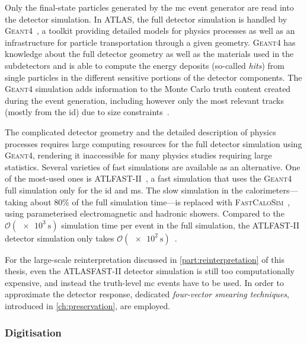 Only the final-state particles generated by the \gls{mc} event generator are read into the detector simulation. In ATLAS, the full detector simulation is handled by \textsc{Geant4}~\cite{geant:2002hh}, a toolkit providing detailed models for physics processes as well as an infrastructure for particle transportation through a given geometry. \textsc{Geant4} has knowledge about the full detector geometry as well as the materials used in the subdetectors and is able to compute the energy deposits (so-called \textit{hits}) from single particles in the different sensitive portions of the detector components. The \textsc{Geant4} simulation adds information to the Monte Carlo truth content created during the event generation, including however only the most relevant tracks (mostly from the \gls{id}) due to size constraints~\cite{Aad:2010ah}.

The complicated detector geometry and the detailed description of physics processes requires large computing resources for the full detector simulation using \textsc{Geant4}, rendering it inaccessible for many physics studies requiring large statistics. Several varieties of fast simulations are available as an alternative. One of the most-used ones is \textsc{ATLFAST-II}~\cite{Aad:2010ah}, a fast simulation that uses the \textsc{Geant4} full simulation only for the \gls{id} and \gls{ms}. The slow simulation in the calorimeters---taking about 80\% of the full simulation time---is replaced with \textsc{FastCaloSim}~\cite{ATL-SOFT-PUB-2018-002}, using parameterised electromagnetic and hadronic showers. Compared to the $\mathcal{O}(\SI{e3}{\second})$ simulation time per event in the full simulation, the \textsc{ATLFAST-II} detector simulation only takes $\mathcal{O}(\SI{e2}{\second})$~\cite{Aad:2010ah}. 

For the large-scale reinterpretation discussed in \cref{part:reinterpretation} of this thesis, even the ATLASFAST-II detector simulation is still too computationally expensive, and instead the truth-level \gls{mc} events have to be used. In order to approximate the detector response, dedicated \textit{four-vector smearing techniques}, introduced in \cref{ch:preservation}, are employed.

\subsubsection{Digitisation}

